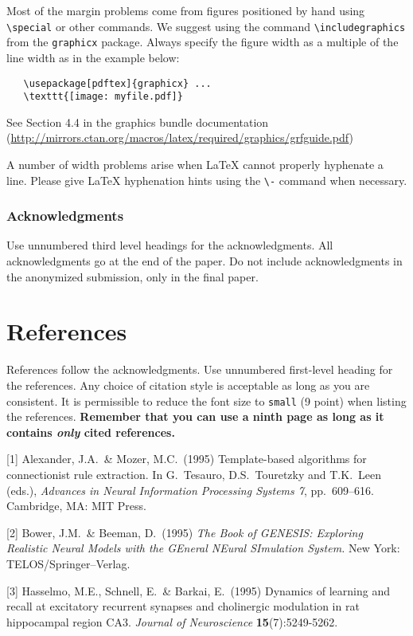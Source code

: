 \documentclass{article}
\begin{document}
Most of the margin problems come from figures positioned by hand using
\verb+\special+ or other commands. We suggest using the command
\verb+\includegraphics+ from the \verb+graphicx+ package. Always
specify the figure width as a multiple of the line width as in the
example below:
\begin{verbatim}
   \usepackage[pdftex]{graphicx} ...
   \texttt{[image: myfile.pdf]}
\end{verbatim}
See Section 4.4 in the graphics bundle documentation
(\url{http://mirrors.ctan.org/macros/latex/required/graphics/grfguide.pdf})

A number of width problems arise when \LaTeX{} cannot properly
hyphenate a line. Please give LaTeX hyphenation hints using the
\verb+\-+ command when necessary.

\subsubsection*{Acknowledgments}

Use unnumbered third level headings for the acknowledgments. All
acknowledgments go at the end of the paper. Do not include
acknowledgments in the anonymized submission, only in the final paper.

\section*{References}

References follow the acknowledgments. Use unnumbered first-level
heading for the references. Any choice of citation style is acceptable
as long as you are consistent. It is permissible to reduce the font
size to \verb+small+ (9 point) when listing the references. {\bf
  Remember that you can use a ninth page as long as it contains
  \emph{only} cited references.}
\medskip

\small

[1] Alexander, J.A.\ \& Mozer, M.C.\ (1995) Template-based algorithms
for connectionist rule extraction. In G.\ Tesauro, D.S.\ Touretzky and
T.K.\ Leen (eds.), {\it Advances in Neural Information Processing
  Systems 7}, pp.\ 609--616. Cambridge, MA: MIT Press.

[2] Bower, J.M.\ \& Beeman, D.\ (1995) {\it The Book of GENESIS:
  Exploring Realistic Neural Models with the GEneral NEural SImulation
  System.}  New York: TELOS/Springer--Verlag.

[3] Hasselmo, M.E., Schnell, E.\ \& Barkai, E.\ (1995) Dynamics of
learning and recall at excitatory recurrent synapses and cholinergic
modulation in rat hippocampal region CA3. {\it Journal of
  Neuroscience} {\bf 15}(7):5249-5262.
  
\end{document}
